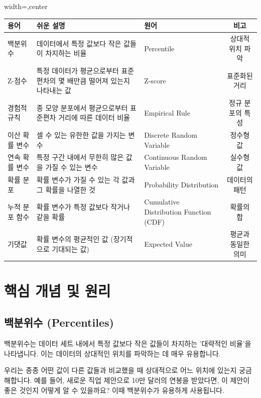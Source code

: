 \documentclass[11pt,a4paper]{article}
\theoremstyle{definition}
\begin{document}
\begin{adjustbox}{width=\textwidth,center}
\begin{tabular}{lllc}
\toprule
\textbf{용어} & \textbf{쉬운 설명} & \textbf{원어} & \textbf{비고} \\
\midrule
백분위수 & 데이터에서 특정 값보다 작은 값들이 차지하는 비율 & Percentile & 상대적 위치 파악 \\
Z-점수 & 특정 데이터가 평균으로부터 표준편차의 몇 배만큼 떨어져 있는지 나타내는 값 & Z-score & 표준화된 거리 \\
경험적 규칙 & 종 모양 분포에서 평균으로부터 표준편차 거리에 따른 데이터 비율 & Empirical Rule & 정규 분포의 특성 \\
이산 확률 변수 & 셀 수 있는 유한한 값을 가지는 변수 & Discrete Random Variable & 정수형 값 \\
연속 확률 변수 & 특정 구간 내에서 무한히 많은 값을 가질 수 있는 변수 & Continuous Random Variable & 실수형 값 \\
확률 분포 & 확률 변수가 가질 수 있는 각 값과 그 확률을 나열한 것 & Probability Distribution & 데이터의 패턴 \\
누적 분포 함수 & 확률 변수가 특정 값보다 작거나 같을 확률 & Cumulative Distribution Function (CDF) & 확률의 합 \\
기댓값 & 확률 변수의 평균적인 값 (장기적으로 기대되는 값) & Expected Value & 평균과 동일한 의미 \\
\bottomrule
\end{tabular}
\end{adjustbox}

\newpage
\section{핵심 개념 및 원리}

\subsection{백분위수 (Percentiles)}

\begin{summarybox}[title=백분위수 핵심 요약]
백분위수는 데이터 세트 내에서 특정 값보다 작은 값들이 차지하는 '대략적인 비율'을 나타냅니다. 이는 데이터의 상대적인 위치를 파악하는 데 매우 유용합니다.
\end{summarybox}

우리는 종종 어떤 값이 다른 값들과 비교했을 때 상대적으로 어느 위치에 있는지 궁금해합니다. 예를 들어, 새로운 직업 제안으로 10만 달러의 연봉을 받았다면, 이 제안이 좋은 것인지 어떻게 알 수 있을까요? 이때 백분위수가 유용하게 사용됩니다.
\end{document}

